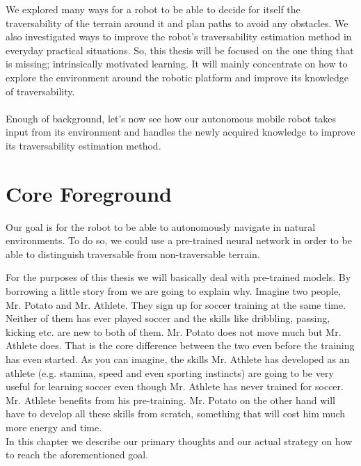 \documentclass[12pt,a4paper,table,dvipsnames,tikz]{report}
\begin{document}
	We explored many ways for a robot to be able to decide for itself the 
	traversability of the terrain around it and plan paths to avoid any obstacles. 
	We also investigated ways to improve the robot's traversability estimation 
	method in everyday practical situations. So, this thesis will be focused on the 
	one thing that is missing; intrinsically motivated learning. It will mainly 
	concentrate on how to explore the environment around the robotic platform and 
	improve its knowledge of traversability.
	\\\\
	
	Enough of background, let’s now see how our autonomous mobile robot takes input 
	from its environment and handles the newly acquired knowledge to improve its 
	traversability estimation method.
	\\
	
	
	\chapter{Core Foreground}
	\label{sec:fg}
	
	Our goal is for the robot to be able to autonomously navigate in natural environments. 
	To do so, we could use a pre-trained neural network in order to be able to distinguish 
	traversable from non-traversable terrain.
	\par
	For the purposes of this thesis we will basically deal with pre-trained models. By
	borrowing a little story from \citet{Gupta} we are going to explain why. Imagine two 
	people, Mr. Potato and Mr. Athlete. They sign up for soccer training at the same time. 
	Neither of them has ever played soccer and the skills like dribbling, passing, 
	kicking etc. are new to both of them. Mr. Potato does not move much but Mr. Athlete 
	does. That is the core difference between the two even before the training has even 
	started. As you can imagine, the skills Mr. Athlete has developed as an athlete 
	(e.g. stamina, speed and even sporting instincts) are going to be very useful for 
	learning soccer even though Mr. Athlete has never trained for soccer. Mr. Athlete 
	benefits from his pre-training. Mr. Potato on the other hand will have to develop all 
	these skills from scratch, something that will cost him much more energy and time.
	\\
	
	In this chapter we describe our primary thoughts and our actual strategy on how to 
	reach the aforementioned goal.
	\\
	
\end{document}

